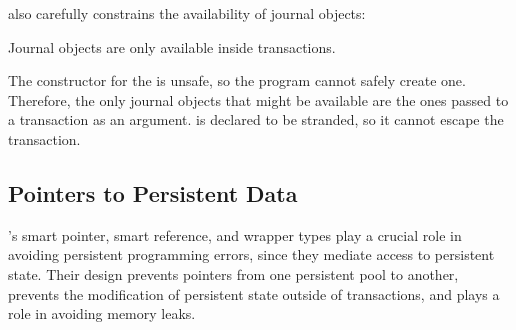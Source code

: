 \This{} also carefully constrains the availability of journal objects:


\begin{invar}
  \label{inv:tx-journal-only} 
  Journal objects are only available inside transactions.  
\end{invar}

\begin{discuss}
  The constructor for the  is unsafe, so the program cannot
  safely create one.  Therefore, the only journal objects that might be
  available are the ones passed to a transaction as an argument.
   is declared to be stranded, so it cannot escape the transaction.
  
\end{discuss}


\subsection{Pointers to Persistent Data}

\This{}'s smart pointer, smart reference, and wrapper types play a crucial role
in avoiding persistent programming errors, since they mediate access to
persistent state.  Their design prevents pointers from one persistent pool to
another, prevents the modification of persistent state outside of transactions,
and plays a role in avoiding memory leaks.

